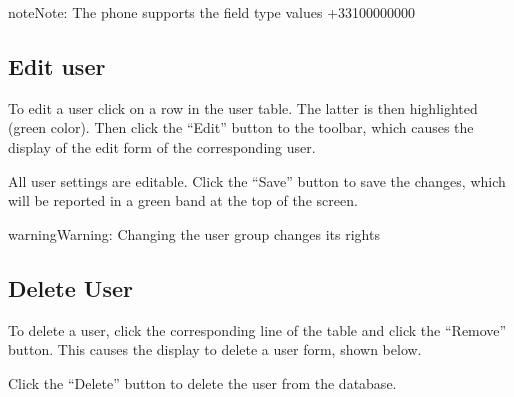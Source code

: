 \documentclass[letterpaper,10pt,english]{sphinxmanual}
\begin{document}
\begin{notice}{note}{Note:}
The phone supports the field type values +33100000000
\end{notice}


\subsection{Edit user}
\label{dashboard/usersmanagement:editer-un-utilisateur}
To edit a user click on a row in the user table. The latter is then highlighted (green color). Then click the ``Edit'' button to the toolbar, which causes the display of the edit form of the corresponding user.

All user settings are editable. Click the ``Save'' button to save the changes, which will be reported in a green band at the top of the screen.


\begin{notice}{warning}{Warning:}
Changing the user group changes its rights
\end{notice}


\subsection{Delete User}
\label{dashboard/usersmanagement:supprimer-un-utilisateur}
To delete a user, click the corresponding line of the table and click the ``Remove'' button. This causes the display to delete a user form, shown below.


Click the ``Delete'' button to delete the user from the database.
\end{document}
